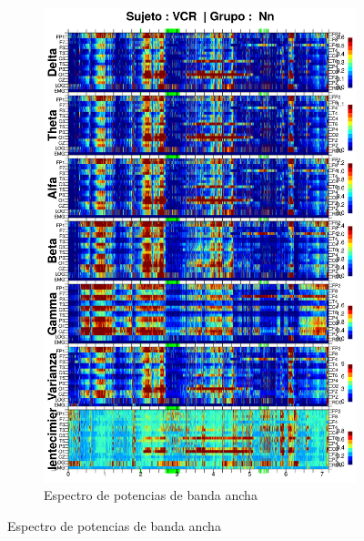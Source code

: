 \begin{figure}
\ContinuedFloat
\begin{subfigure}{\linewidth}
\centering
\includegraphics[width=0.9\linewidth]
{./enlentecimiento/VCNNS1_espectral_total.png} 
\caption{Espectro de potencias de banda ancha}
\end{subfigure}
\end{figure}

